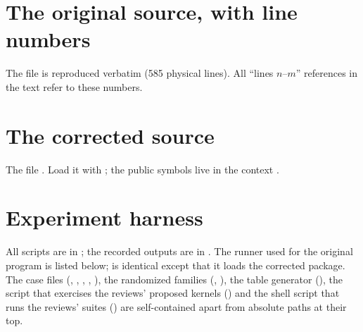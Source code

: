 \section{The original source, with line numbers}
\label{app:original}
The file  is reproduced verbatim (585 physical
lines). All ``lines $n$--$m$'' references in the text refer to these numbers.


\clearpage
\section{The corrected source}
\label{app:fixed}
The file . Load it with
; the public symbols live in the context
.


\clearpage
\section{Experiment harness}
\label{app:harness}
All scripts are in ; the recorded
outputs are in . The runner used for the original program is
listed below;  is identical except that it loads the
corrected package. The case files (,
, , ,
), the randomized families (,
), the table generator (), the
script that exercises the reviews' proposed kernels
() and the shell script that runs the reviews'
suites () are self-contained apart from absolute paths at
their top.



